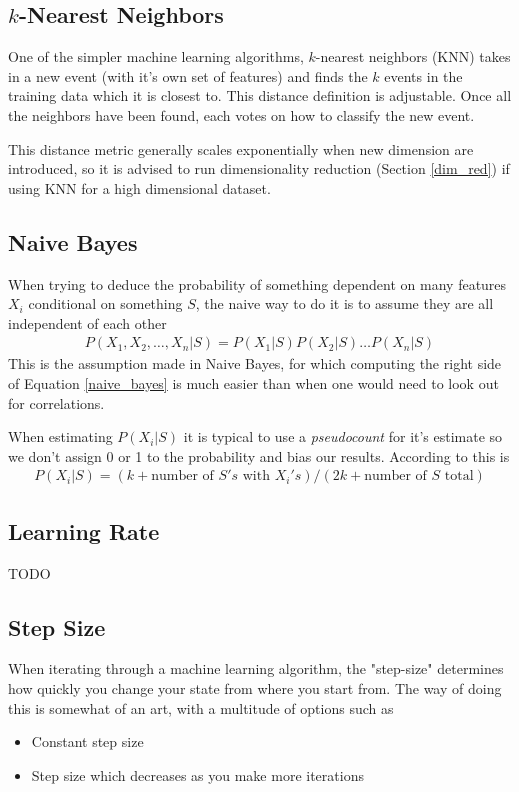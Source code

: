 \subsection{$k$-Nearest Neighbors}\label{sub:knn}
One of the simpler machine learning algorithms, $k$-nearest neighbors (KNN) takes in a new event (with it's own set of features) and finds the  $k$ events in the training data which it is closest to. This distance definition is adjustable. Once all the neighbors have been found, each votes on how to classify the new event.

This distance metric generally scales exponentially when new dimension are introduced, so it is advised to run dimensionality reduction (Section \ref{dim_red}) if using KNN for a high dimensional dataset.
\subsection{Naive Bayes}
When trying to deduce the probability of something dependent on many features $X_i$ conditional on something $S$, the naive way to do it is to assume they are all independent of each other
\begin{align}\label{naive_bayes}
	P(X_1,X_2,\dots,X_n|S) = P(X_1|S)P(X_2|S)\dots P(X_n|S)
\end{align}
This is the assumption made in Naive Bayes, for which computing the right side of Equation \ref{naive_bayes} is much easier than when one would need to look out for correlations.

When estimating $P(X_i|S)$ it is typical to use a \textit{pseudocount} for it's estimate so we don't assign 0 or 1 to the probability and bias our results. According to \cite{sutton} this is
\begin{align}
	P(X_i|S) = (k+\textrm{number~of~} S's\textrm{~with~} X_i's) / (2k+\textrm{number~of~} S \textrm{~total})
\end{align}


\subsection{Learning Rate}
TODO

\subsection{Step Size}
When iterating through a machine learning algorithm, the "step-size" determines how quickly you change your state from where you start from. The way of doing this is somewhat of an art, with a multitude of options such as 
\begin{itemize}
	\item Constant step size
	\item Step size which decreases as you make more iterations
\end{itemize}

